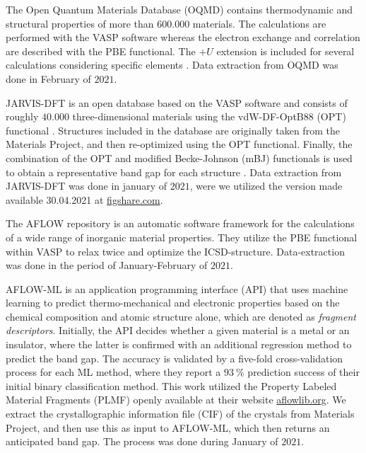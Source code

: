 \documentclass[superscriptaddress,unsortedaddress,
 amsmath,amssymb,
 aps,
]{revtex4-2}
\begin{document}
The Open Quantum Materials Database (OQMD) \cite{Saal2013, Kirklin2015} contains thermodynamic and structural properties of more than $600.000$  materials. The calculations are performed with the VASP software whereas the electron exchange and correlation are described with the PBE functional. The $+U$ extension is included for several calculations considering specific elements \cite{Stevanovic2012}. Data extraction from OQMD was done in February of $2021$. 

JARVIS-DFT \cite{Choudhary2020} is an open database based on the VASP software and consists of roughly $40.000$ three-dimensional materials using the vdW-DF-OptB88 (OPT) functional \cite{Thonhauser2007, Klimes2011}. Structures included in the database are originally taken from the Materials
Project, and then re-optimized using the OPT functional. Finally, the combination of the OPT and modified Becke-Johnson (mBJ) functionals is used to obtain a representative band gap for each structure \cite{Choudhary2018a}. Data extraction from JARVIS-DFT was done in january of $2021$, were we utilized the version made available 30.04.2021 at \url{figshare.com}.

The AFLOW \cite{Curtarolo2012, Curtarolo2012a, Calderon2015} repository is an automatic software framework for the calculations of a wide range of inorganic material properties. They utilize the PBE functional within VASP
to relax twice and optimize the ICSD-structure. Data-extraction was done in the period of January-February of $2021$.

AFLOW-ML \cite{Isayev2017} is an application programming interface (API) that uses machine learning to predict thermo-mechanical and electronic properties based on the chemical composition and atomic structure alone, which are denoted as \textit{fragment descriptors}. Initially, the API decides whether a given material is a metal or an insulator, where the latter is confirmed with an additional regression method to predict the band gap. The accuracy is validated by a five-fold cross-validation process for each ML method, where they report a $93 \ \%$ prediction success of their initial binary classification method. This work utilized the Property Labeled Material Fragments (PLMF) openly available at their website \url{aflowlib.org}. We extract the crystallographic information file (CIF) of the crystals from Materials Project, and then use this as input to AFLOW-ML, which then returns an anticipated band gap. The process was done during January of $2021$. 
\end{document}
